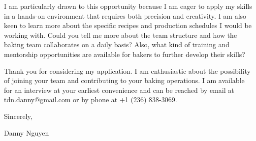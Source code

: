 \documentclass[letterpaper,11pt]{article}
\begin{document}
I am particularly drawn to this opportunity because I am eager to apply my skills in a hands-on environment that requires both precision and creativity. I am also keen to learn more about the specific recipes and production schedules I would be working with. Could you tell me more about the team structure and how the baking team collaborates on a daily basis? Also, what kind of training and mentorship opportunities are available for bakers to further develop their skills?

Thank you for considering my application. I am enthusiastic about the possibility of joining your team and contributing to your baking operations. I am available for an interview at your earliest convenience and can be reached by email at tdn.danny@gmail.com or by phone at +1 (236) 838-3069.

Sincerely,

\vspace{40pt} %
Danny Nguyen

\end{document}
